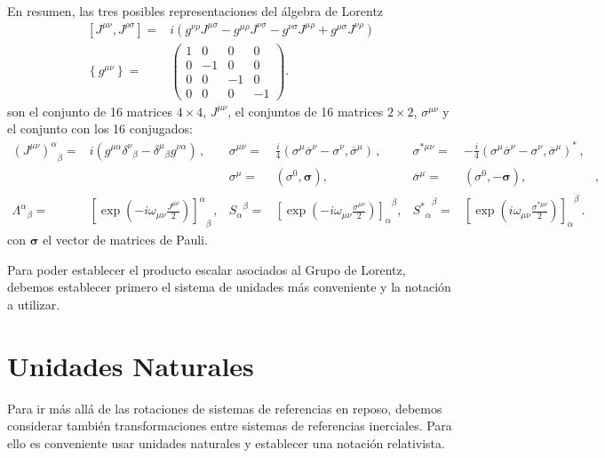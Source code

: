 \begin{frame}
En resumen, las tres posibles representaciones del álgebra de Lorentz
\begin{align}
  \left[{J}^{\mu\nu},{J}^{\rho\sigma}\right]=&
i(g^{\nu\rho}{J}^{\mu\sigma}-g^{\mu\rho}{J}^{\nu\sigma}-g^{\nu\sigma}{J}^{\mu\rho}+g^{\mu\sigma}{J}^{\nu\rho})\nonumber\\
  \left\{ g^{\mu\nu} \right\}=&
  \begin{pmatrix}
    1&0&0&0\\
    0&-1&0&0\\
    0&0&-1&0\\
    0&0&0&-1
  \end{pmatrix}.
\end{align}
son el conjunto de 16 matrices $4\times4$, $J^{\mu\nu}$, el conjuntos de 16 matrices  $2\times2$, $\sigma^{\mu\nu}$ y el conjunto con los 16 conjugados:
\begin{align}
  {\left(J^{\mu\nu}\right)^{\alpha}}_{\beta}
  =&i\left(g^{\mu\alpha}{\delta^\nu}_\beta-{\delta^\mu}_\beta g^{\nu\alpha}\right)\,, &
  \sigma^{\mu\nu}=&\frac{i}{4}\left(\sigma^\mu\overline{\sigma}^\nu-\sigma^\nu,\overline{\sigma}^\mu\right)\,,&
  \sigma^{*\mu\nu}=&-\frac{i}{4}\left(\sigma^\mu\overline{\sigma}^\nu-\sigma^\nu,\overline{\sigma}^\mu\right)^{*}\,,\nonumber\\
 && \sigma^{\mu}=&
    \left( \sigma^0 , \boldsymbol{\sigma} \right),&
\overline{\sigma}^{\mu}=&
\left( \sigma^0 , -\boldsymbol{\sigma} \right),&,\nonumber\\
   {{\Lambda}^{\alpha}}_{\beta}=&{\left[ \exp\left(-i\omega_{\mu\nu}\frac{{J}^{\mu\nu}}{2}\right) \right]^{\alpha}}_{\beta}\,,&  {S_{\alpha}}^{\beta}=&{\left[\exp\left(-i \omega_{\mu\nu}\frac{\sigma^{\mu\nu}}{2}\right)  \right]_{\alpha}}^{\beta},&
{{S^{*}}_{\dot{\alpha}}}^{\dot{\beta}}=&{\left[ \exp\left(i \omega_{\mu\nu}\frac{\sigma^{*\mu\nu}}{2}\right)  \right]_{\dot{\alpha}}}^{\dot{\beta}}\,. \nonumber
\end{align}
con $\boldsymbol{\sigma}$ el vector de matrices de Pauli.
\end{frame}




Para poder establecer el producto escalar asociados al Grupo de Lorentz, debemos establecer primero el sistema de unidades más conveniente y la notación a utilizar.



\section{Unidades Naturales}
\label{sec:NU}
Para ir más allá de las rotaciones de sistemas de referencias en reposo, debemos considerar también transformaciones entre sistemas de referencias inerciales. Para ello es conveniente usar unidades naturales y establecer una notación relativista.


